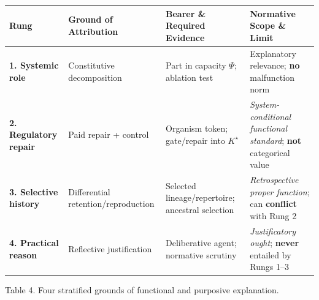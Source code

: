 \documentclass[12pt,letterpaper]{article}
\newcounter{none}
\begin{document}
{\def\LTcaptype{none} %
\begin{longtable}[]{@{}
  >{\raggedright\arraybackslash}p{}
  >{\raggedright\arraybackslash}p{}
  >{\raggedright\arraybackslash}p{}
  >{\raggedright\arraybackslash}p{}@{}}
\toprule\noalign{}
\begin{minipage}[b]{\linewidth}\raggedright
Rung
\end{minipage} & \begin{minipage}[b]{\linewidth}\raggedright
Ground of Attribution
\end{minipage} & \begin{minipage}[b]{\linewidth}\raggedright
Bearer \& Required Evidence
\end{minipage} & \begin{minipage}[b]{\linewidth}\raggedright
Normative Scope \& Limit
\end{minipage} \\
\midrule\noalign{}
\endhead
\bottomrule\noalign{}
\endlastfoot
\textbf{1. Systemic role} & Constitutive decomposition
\citep{cummins1975, craver2007} & Part in capacity \(\Psi\); ablation
test & Explanatory relevance; \textbf{no} malfunction norm
\citep{davies2001} \\
\textbf{2. Regulatory repair} & Paid repair + control
\citep{nagel1977, mossio2009, diPaolo2005, bich2024} & Organism token;
gate/repair into \(K^\star\) & \emph{System-conditional functional
standard}; \textbf{not} categorical value \\
\textbf{3. Selective history} & Differential retention/reproduction
\citep{wright1973, millikan1984, garson2019} & Selected
lineage/repertoire; ancestral selection & \emph{Retrospective proper
function}; can \textbf{conflict} with Rung 2 \\
\textbf{4. Practical reason} & Reflective justification
\citep{korsgaard1996, scanlon1998, list2019} & Deliberative agent;
normative scrutiny & \emph{Justificatory ought}; \textbf{never} entailed
by Rungs 1--3 \citep{street2006} \\
\end{longtable}
}

Table 4. Four stratified grounds of functional and purposive
explanation.
\end{document}
